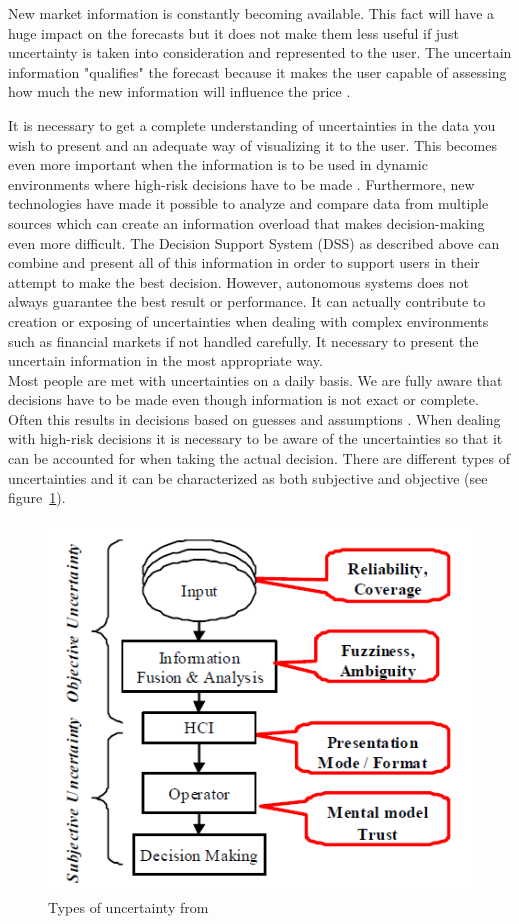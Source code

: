 New market information is constantly becoming available. This fact will have a huge impact on the forecasts but it does not make them less useful if just uncertainty is taken into consideration and represented to the user. The uncertain information "qualifies" the forecast because it makes the user capable of assessing how much the new information will influence the price \cite{EnergyPriceForecasting}.
  
It is necessary to get a complete understanding of uncertainties in the data you wish to present and an adequate way of visualizing it to the user. This becomes even more important when the information is to be used in dynamic environments where high-risk decisions have to be made \cite{UncertainInformation}. Furthermore, new technologies have made it possible to analyze and compare data from multiple sources which can create an information overload that makes decision-making even more difficult. The Decision Support System (DSS) as described above can combine and present all of this information in order to support users in their attempt to make the best decision. However, autonomous systems does not always guarantee the best result or performance. It can actually contribute to creation or exposing of uncertainties when dealing with complex environments such as financial markets \cite{UncertainInformation} if not handled carefully. It necessary to present the uncertain information in the most appropriate way.
\\[0.5cm]
Most people are met with uncertainties on a daily basis. We are fully aware that decisions have to be made even though information is not exact or complete. Often this results in decisions based on guesses and assumptions \cite{UncertainInformation}. When dealing with high-risk decisions it is necessary to be aware of the uncertainties so that it can be accounted for when taking the actual decision. 
There are different types of uncertainties and it can be characterized as both subjective and objective (see figure~\ref{fig:typesOfUncertainty}). 
\begin{figure}[h!]
\centering
\includegraphics[width=0.7\linewidth,natwidth=898,natheight=587]{billeder/TypesOfUncertainInformation.png}
\caption{Types of uncertainty from \cite{UncertainInformation}}
\label{fig:typesOfUncertainty}
\end{figure}  
